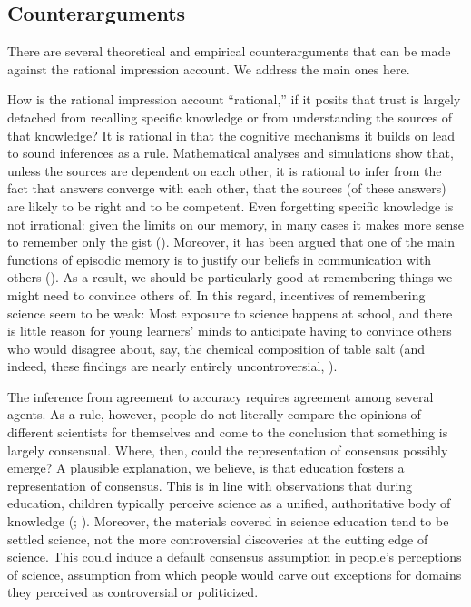 \documentclass[
  jou,
  floatsintext,
  longtable,
  nolmodern,
  notxfonts,
  notimes,
  colorlinks=true,linkcolor=blue,citecolor=blue,urlcolor=blue]{apa7}
\begin{document}
\subsection{Counterarguments}\label{counterarguments}

There are several theoretical and empirical counterarguments that can be
made against the rational impression account. We address the main ones
here.

How is the rational impression account ``rational,'' if it posits that
trust is largely detached from recalling specific knowledge or from
understanding the sources of that knowledge? It is rational in that the
cognitive mechanisms it builds on lead to sound inferences as a rule.
Mathematical analyses and simulations show that, unless the sources are
dependent on each other, it is rational to infer from the fact that
answers converge with each other, that the sources (of these answers)
are likely to be right and to be competent. Even forgetting specific
knowledge is not irrational: given the limits on our memory, in many
cases it makes more sense to remember only the gist
(). Moreover,
it has been argued that one of the main functions of episodic memory is
to justify our beliefs in communication with others
(). As a
result, we should be particularly good at remembering things we might
need to convince others of. In this regard, incentives of remembering
science seem to be weak: Most exposure to science happens at school, and
there is little reason for young learners' minds to anticipate having to
convince others who would disagree about, say, the chemical composition
of table salt (and indeed, these findings are nearly entirely
uncontroversial,
).

The inference from agreement to accuracy requires agreement among
several agents. As a rule, however, people do not literally compare the
opinions of different scientists for themselves and come to the
conclusion that something is largely consensual. Where, then, could the
representation of consensus possibly emerge? A plausible explanation, we
believe, is that education fosters a representation of consensus. This
is in line with observations that during education, children typically
perceive science as a unified, authoritative body of knowledge
(; ). Moreover, the materials covered in science education tend to be
settled science, not the more controversial discoveries at the cutting
edge of science. This could induce a default consensus assumption in
people's perceptions of science, assumption from which people would
carve out exceptions for domains they perceived as controversial or
politicized.
\end{document}
